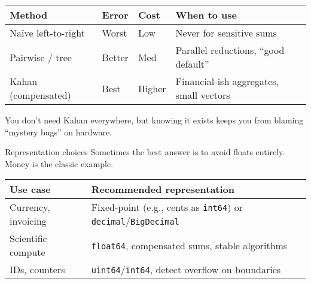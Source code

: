 \documentclass[
  letterpaper,
  DIV=11,
  numbers=noendperiod]{scrreprt}
\begin{document}
\begin{longtable}[]{@{}
  >{\raggedright\arraybackslash}p{}
  >{\raggedright\arraybackslash}p{}
  >{\raggedright\arraybackslash}p{}
  >{\raggedright\arraybackslash}p{}@{}}
\toprule\noalign{}
\begin{minipage}[b]{\linewidth}\raggedright
Method
\end{minipage} & \begin{minipage}[b]{\linewidth}\raggedright
Error
\end{minipage} & \begin{minipage}[b]{\linewidth}\raggedright
Cost
\end{minipage} & \begin{minipage}[b]{\linewidth}\raggedright
When to use
\end{minipage} \\
\midrule\noalign{}
\endhead
\bottomrule\noalign{}
\endlastfoot
Naïve left-to-right & Worst & Low & Never for sensitive sums \\
Pairwise / tree & Better & Med & Parallel reductions, ``good
default'' \\
Kahan (compensated) & Best & Higher & Financial-ish aggregates, small
vectors \\
\end{longtable}

You don't need Kahan everywhere, but knowing it exists keeps you from
blaming ``mystery bugs'' on hardware.

Representation choices Sometimes the best answer is to avoid floats
entirely. Money is the classic example.

\begin{longtable}[]{@{}
  >{\raggedright\arraybackslash}p{}
  >{\raggedright\arraybackslash}p{}@{}}
\toprule\noalign{}
\begin{minipage}[b]{\linewidth}\raggedright
Use case
\end{minipage} & \begin{minipage}[b]{\linewidth}\raggedright
Recommended representation
\end{minipage} \\
\midrule\noalign{}
\endhead
\bottomrule\noalign{}
\endlastfoot
Currency, invoicing & Fixed-point (e.g., cents as \texttt{int64}) or
\texttt{decimal}/\texttt{BigDecimal} \\
Scientific compute & \texttt{float64}, compensated sums, stable
algorithms \\
IDs, counters & \texttt{uint64}/\texttt{int64}, detect overflow on
boundaries \\
\end{longtable}
\end{document}
